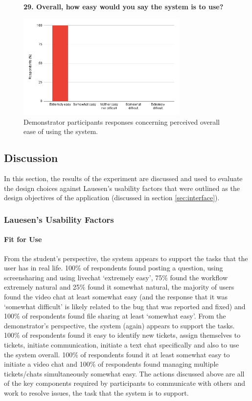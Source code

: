 \begin{figure}[H]
    \centering
    \textbf{29. Overall, how easy would you say the system is to use?}\par\medskip
    \includegraphics[width=0.75\textwidth]{10evaluation/images/dem(2)5.png}
    \caption{Demonstrator participants responses concerning perceived overall ease of using the system.}
    \label{fig:dem29}
\end{figure}

\subsection{Discussion} \label{sec:discusseval}

In this section, the results of the experiment are discussed and used to evaluate the design choices against Lauesen's usability factors \cite{lauesen} that were outlined as the design objectives of the application (discussed in section \ref{sec:interface}).

\subsubsection{Lauesen's Usability Factors}

    \paragraph{Fit for Use} From the student's perspective, the system appears to support the tasks that the user has in real life. 100\% of respondents found posting a question, using screensharing and using livechat `extremely easy', 75\% found the workflow extremely natural and 25\% found it somewhat natural, the majority of users found the video chat at least somewhat easy (and the response that it was `somewhat difficult' is likely related to the bug that was reported and fixed) and 100\% of respondents found file sharing at least `somewhat easy'.
    From the demonstrator's perspective, the system (again) appears to support the tasks. 100\% of respondents found it easy to identify new tickets, assign themselves to tickets, initiate communication, initiate a text chat specifically and also to use the system overall. 100\% of respondents found it at least somewhat easy to initiate a video chat and 100\% of respondents found managing multiple tickets/chats simultaneously somewhat easy. 
    The actions discussed above are all of the key components required by participants to communicate with others and work to resolve issues, the task that the system is to support.
    
